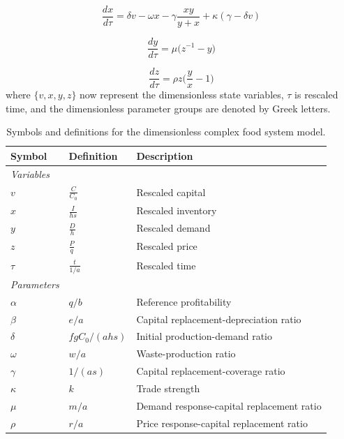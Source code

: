 \documentclass[12pt]{article}
\begin{document}
\begin{equation}
  \frac{dx}{d\tau} = \delta v - \omega x - \gamma \frac{xy}{y + x} + \kappa ( \gamma - \delta v)
  \label{dimensionless_inventory}
\end{equation}

\begin{equation}
  \frac{dy}{d\tau} = \mu \Big( z^{-1} - y\Big)
\end{equation}

\begin{equation}
  \frac{dz}{d\tau} = \rho z\Big(\frac{y}{x} - 1\Big)
\end{equation}
%
where $\{v, x, y, z\}$ now represent the dimensionless state variables, $\tau$ is rescaled time, and the dimensionless parameter groups are denoted by Greek letters.

\begin{table}[b!]
  \centering
  \footnotesize
  \begin{tabular}{lll}
    \textbf{Symbol} & \textbf{Definition} & \textbf{Description} \\ \hline
    \textit{Variables} &\\
    $v$  & $\frac{C}{C_0}$    & Rescaled capital        \\
    $x$  & $\frac{I}{hs}$  & Rescaled inventory      \\
    $y$  & $\frac{D}{h}$  & Rescaled demand             \\
    $z$  & $\frac{P}{q}$  & Rescaled price               \\
    $\tau$  & $\frac{t}{1/a}$  & Rescaled time\\
    \textit{Parameters} &\\
    $\alpha$   & $q/b$  & Reference profitability\\
    $\beta$    & $e/a$  & Capital replacement-depreciation ratio\\
    $\delta$    & $f g C_{0}/(ahs)$ & Initial production-demand ratio\\
    $\omega$    & $w/a$ & Waste-production ratio\\
    $\gamma$    & $1/(as)$ & Capital replacement-coverage ratio\\
    $\kappa$    & $k$    & Trade strength \\
    $\mu$       & $m/a$  & Demand response-capital replacement ratio\\
    $\rho$      & $r/a$  & Price response-capital replacement ratio\\
    \hline
  \end{tabular}
  \caption{Symbols and definitions for the dimensionless complex food system model.}
  \label{t_nd_symbols}
\end{table}
\end{document}
